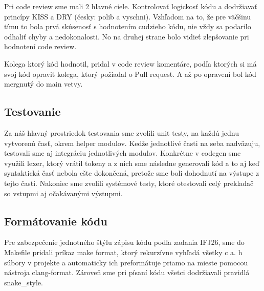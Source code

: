 Pri code review sme mali 2 hlavné ciele. Kontrolovať logickosť kódu a dodržiavať princípy KISS a DRY (česky: polib a vyschni). Vzhľadom na to, že pre väčšinu tímu to bola prvá skúsenosť s hodnotením cudzieho kódu, nie vždy sa podarilo odhaliť chyby a nedokonalosti. No na druhej strane bolo vidieť zlepšovanie pri hodnotení code review. 

Kolega ktorý kód hodnotil, pridal v code review komentáre, podľa ktorých si má svoj kód opraviť kolega, ktorý požiadal o Pull request. A až po opravení bol kód mergnutý do main vetvy.

\subsection{Testovanie}
Za náš hlavný prostriedok testovania sme zvolili unit testy, na každú jednu vytvorenú časť, okrem helper modulov. Kedže jednotlivé časti na seba nadväzuju, testovali sme aj integráciu jednotlivých modulov. Konkrétne v codegen sme využili lexer, ktorý vrátil tokeny a z nich sme následne generovali kód a to aj keď syntaktická časť nebola ešte dokončená, pretože sme boli dohodnutí na výstupe z tejto časti. Nakoniec sme zvolili systémové testy, ktoré otestovali celý prekladač so vstupmi aj očakávanými výstupmi. 

\subsection{Formátovanie kódu}
Pre zabezpečenie jednotného štýlu zápisu kódu podľa zadania IFJ26, sme do Makefile pridali príkaz make format, ktorý rekurzívne vyhľadá všetky c a. h súbory v projekte a automaticky ich preformátuje priamo na mieste pomocou nástroja clang-format. Zároveň sme pri písaní kódu všetci dodržiavali pravidlá snake\_style.

\newpage